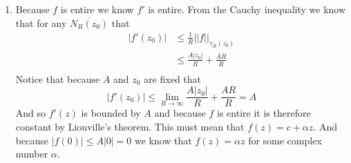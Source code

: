 \documentclass[12pt]{amsart}
\theoremstyle{definition}
\newcommand{\ra}{\rightarrow}
\newcommand{\abs}[1]{\left| #1 \right|}
\newcommand{\overbar}[1]{\overline{#1}}
\begin{document}
\begin{enumerate}
\begin{enumerate}
    \item Because $f$ is entire we know $f'$ is entire. From the Cauchy inequality we know that for any $\overbar{N_R(z_0)}$ that
    \begin{align*}
        \abs{f'(z_0)}&\leq \frac{1}{R}||f||_{\gamma_R(z_0)} \\
        &\leq \frac{A|z_0|}{R}+\frac{AR}{R}\\
    \end{align*}
    Notice that because $A$ and $z_0$ are fixed that 
    $$\abs{f'(z_0)}\leq \lim_{R\ra \infty}\frac{A|z_0|}{R}+\frac{AR}{R}=A$$
    And so  $f'(z)$ is bounded by $A$ and because $f$ is entire it is therefore constant by Liouville's theorem. This must mean that $f(z)=c+\alpha z$. And because $|f(0)|\leq A|0|=0$ we know that $f(z)=\alpha z$ for some complex number $\alpha$.
\end{enumerate}

\end{enumerate}
\end{document}
